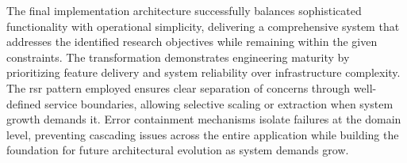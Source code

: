 The final implementation architecture successfully balances sophisticated functionality with operational simplicity, delivering a comprehensive system that addresses the identified research objectives while remaining within the given constraints. The transformation demonstrates engineering maturity by prioritizing feature delivery and system reliability over infrastructure complexity. The \ac{rsr} pattern employed ensures clear separation of concerns through well-defined service boundaries, allowing selective scaling or extraction when system growth demands it. Error containment mechanisms isolate failures at the domain level, preventing cascading issues across the entire application while building the foundation for future architectural evolution as system demands grow.
